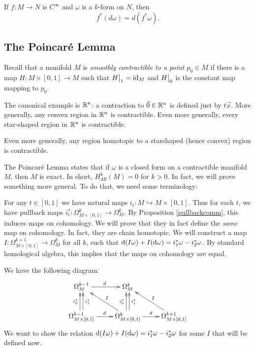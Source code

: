 \documentclass[11pt, english]{article}
\begin{document}
\begin{prop}
\label{pullbackcomm}
If $f:M \to N$ is $C^\infty$ and $\omega$ is a $k$-form on $N$, then 
\[
f^\ast (d \omega) = d(f^\ast \omega).
 \]

 \end{prop}

\subsection{The Poincaré Lemma}

Recall that a manifold $M$ is \emph{smoothly contractible to a point $p_0 \in M$} if there is a map $H:M \times [0,1] \to M$ such that $\restr{H}{1}=\id_M$ and $\restr{H}{0}$ is the constant map mapping to $p_0$. 

\begin{example}
The canonical example is $\mathbb{R}^n$: a contraction to $\vec 0 \in \mathbb{R}^n$ is defined just by $t \vec x $. More generally, any convex region in $\mathbb{R}^n$ is contractible. Even more generally, every star-shaped region in $\mathbb{R}^n$ is contractible. 

Even more generally, any region homotopic to a starshaped (hence convex) region is contractible.
\end{example}

The Poincaré Lemma states that if $\omega$ is a closed form on a contractible manifold $M$, then $M$ is exact. In short, $H^k_{dR}(M)=0$ for $k > 0$. In fact, we will prove something more general. To do that, we need some terminology:

For any $t \in [0,1]$ we have natural maps $i_t: M \hookrightarrow M \times [0,1]$. Thus for each $t$, we have pullback maps $i_t^\ast: \Omega_{M \times [0,1]}^k \to \Omega_M^k$. By Proposition \ref{pullbackcomm}, this induces maps on cohomology. We will prove that they in fact define the \emph{same} map on cohomology. In fact, they are chain homotopic. We will construct a map $I:\Omega_{M \times [0,1]}^{k+1} \to \Omega_M^k$ for all $k$, such that $\mathrm{d}{(}I \omega)+I(\mathrm{d}{\omega}) = i_1^\ast \omega - i_2^\ast \omega$. By standard homological algebra, this implies that the maps on cohomology are equal.

We have the following diagram:
\[
\xymatrix{
\Omega_M^{k-1} \ar[r]^d & \Omega_M^k & \\
\Omega_{M \times [0,1]}^{k-1} \ar@<-0.5ex>[u]_{i_1^\ast} \ar@<0.5ex>[u]^{i_0^\ast } \ar[r]^d &
\Omega_{M \times[0,1]}^k \ar@<-0.5ex>[u]_{i_1^\ast} \ar@<0.5ex>[u]^{i_0^\ast } \ar[r]^d  \ar[ul]_I &
\Omega_{M \times[0,1]}^{k+1} \ar[ul]_I
}
\]
We want to show the relation $\mathrm{d}{(}I \omega)+I(\mathrm{d}{\omega})=i_1^\ast \omega - i_2^\ast \omega$ for some $I$ that will be defined now.
\end{document}
